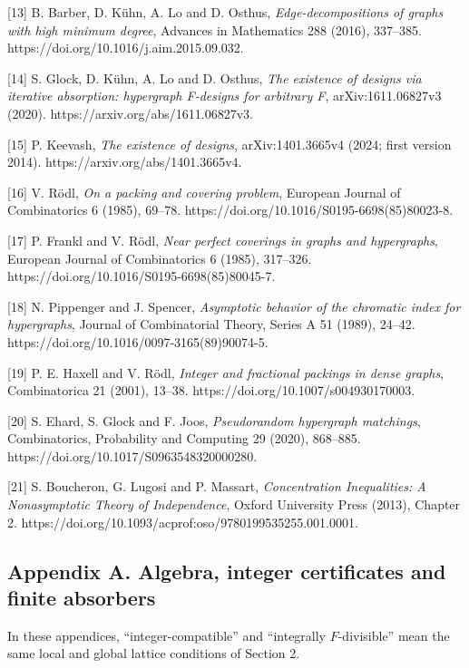 \documentclass[english,11pt,a4paper]{article}
\begin{document}
{[}13{]} B. Barber, D. Kühn, A. Lo and D. Osthus, \emph{Edge-decompositions of graphs with high minimum degree}, Advances in Mathematics 288 (2016), 337--385. https://doi.org/10.1016/j.aim.2015.09.032.

{[}14{]} S. Glock, D. Kühn, A. Lo and D. Osthus, \emph{The existence of designs via iterative absorption: hypergraph F-designs for arbitrary F}, arXiv:1611.06827v3 (2020). https://arxiv.org/abs/1611.06827v3.

{[}15{]} P. Keevash, \emph{The existence of designs}, arXiv:1401.3665v4 (2024; first version 2014). https://arxiv.org/abs/1401.3665v4.

{[}16{]} V. Rödl, \emph{On a packing and covering problem}, European Journal of Combinatorics 6 (1985), 69--78. https://doi.org/10.1016/S0195-6698(85)80023-8.

{[}17{]} P. Frankl and V. Rödl, \emph{Near perfect coverings in graphs and hypergraphs}, European Journal of Combinatorics 6 (1985), 317--326. https://doi.org/10.1016/S0195-6698(85)80045-7.

{[}18{]} N. Pippenger and J. Spencer, \emph{Asymptotic behavior of the chromatic index for hypergraphs}, Journal of Combinatorial Theory, Series A 51 (1989), 24--42. https://doi.org/10.1016/0097-3165(89)90074-5.

{[}19{]} P. E. Haxell and V. Rödl, \emph{Integer and fractional packings in dense graphs}, Combinatorica 21 (2001), 13--38. https://doi.org/10.1007/s004930170003.

{[}20{]} S. Ehard, S. Glock and F. Joos, \emph{Pseudorandom hypergraph matchings}, Combinatorics, Probability and Computing 29 (2020), 868--885. https://doi.org/10.1017/S0963548320000280.

{[}21{]} S. Boucheron, G. Lugosi and P. Massart, \emph{Concentration Inequalities: A Nonasymptotic Theory of Independence}, Oxford University Press (2013), Chapter 2. https://doi.org/10.1093/acprof:oso/9780199535255.001.0001.

\endgroup
\clearpage

\subsection{Appendix A. Algebra, integer certificates and finite absorbers}\label{appendix-a.-algebra-integer-certificates-and-finite-absorbers}

In these appendices, ``integer-compatible'' and ``integrally \(F\)-divisible'' mean the same local and global lattice conditions of Section 2.
\end{document}
